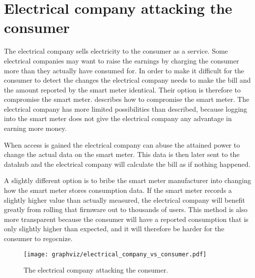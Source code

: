 \section{Electrical company attacking the consumer}
The electrical company sells electricity to the consumer as a service.
Some electrical companies may want to raise the earnings by charging the consumer more than they actually have consumed for.
In order to make it difficult for the consumer to detect the changes the electrical company needs to make the bill and the amount reported by the smart meter identical.
Their option is therefore to compromise the smart meter.
 describes how to compromise the smart meter.
The electrical company has more limited possibilities than described, because logging into the smart meter does not give the electrical company any advantage in earning more money.

When access is gained the electrical company can abuse the attained power to change the actual data on the smart meter.
This data is then later sent to the datahub and the electrical company will calculate the bill as if nothing happened.

A slightly different option is to bribe the smart meter manufacturer into changing how the smart meter stores consumption data.
If the smart meter records a slightly higher value than actually measured, the electrical company will benefit greatly from rolling that firmware out to thousands of users.
This method is also more transparent because the consumer will have a reported consumption that is only slightly higher than expected, and it will therefore be harder for the consumer to regocnize.

\begin{figure}
  \begin{center}
    \texttt{[image: graphviz/electrical\_company\_vs\_consumer.pdf]}
  \end{center}
  \caption{The electrical company attacking the consumer.}
  \label{electrical_vs_consumer}
\end{figure}
